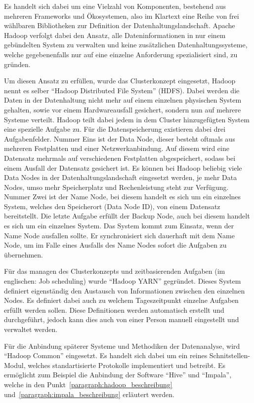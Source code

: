 Es handelt sich dabei um eine Vielzahl von Komponenten, bestehend aus mehreren
Frameworks und Ökosystemen, also im Klartext eine Reihe von frei wählbaren
Bibliotheken zur Definition der Datenhaltungslandschaft. Apache Hadoop verfolgt
dabei den Ansatz, alle Dateninformationen in nur einem gebündelten System zu
verwalten und keine zusätzlichen Datenhaltungssysteme, welche gegebenenfalls
nur auf eine einzelne Anforderung spezialisiert sind, zu gründen.

Um diesen Ansatz zu erfüllen, wurde das Clusterkonzept eingesetzt, Hadoop nennt
es selber ``Hadoop Distributed File System'' (HDFS).  Dabei werden die Daten in
der Datenhaltung nicht mehr auf einem einzelnen physischen System gehalten,
sowie vor einem Hardwareausfall gesichert, sondern nun auf mehrere Systeme
verteilt. Hadoop teilt dabei jedem in dem Cluster hinzugefügten System eine
spezielle Aufgabe zu. Für die Datenspeicherung existieren dabei drei
Aufgabenfelder. Nummer Eins ist der Data Node, dieser besteht oftmals aus
mehreren Festplatten und einer Netzwerkanbindung. Auf diesem wird eine
Datensatz mehrmals auf verschiedenen Festplatten abgespeichert, sodass bei
einem Ausfall der Datensatz gesichert ist. Es können bei Hadoop beliebig viele
Data Nodes in der Datenhaltungslandschaft eingesetzt werden, je mehr Data
Nodes, umso mehr Speicherplatz und Rechenleistung steht zur Verfügung. Nummer
Zwei ist der Name Node, bei diesem handelt es sich um ein einzelnes System,
welches den Speicherort (Data Node ID), von einem Datensatz bereitstellt. Die
letzte Aufgabe erfüllt der Backup Node, auch bei diesem handelt es sich um ein
einzelnes System. Das System kommt zum Einsatz, wenn der Name Node ausfallen
sollte. Er synchronisiert sich dauerhaft mit dem Name Node, um im Falle eines
Ausfalls des Name Nodes sofort die Aufgaben zu übernehmen.

Für das managen des Clusterkonzepts und zeitbasierenden Aufgaben (im
englischen: Job scheduling) wurde ``Hadoop YARN'' gegründet. Dieses System
definiert eigenständig den Austausch von Informationen zwischen den einzelnen
Nodes. Es definiert dabei auch zu welchem Tageszeitpunkt einzelne Aufgaben
erfüllt werden sollen. Diese Definitionen werden automatisch erstellt und
durchgeführt, jedoch kann dies auch von einer Person manuell eingestellt und
verwaltet werden.

Für die Anbindung späterer Systeme und Methodiken der Datenanalyse, wird
``Hadoop Common'' eingesetzt. Es handelt sich dabei um ein reines
Schnitstellen-Modul, welches standartisierte Protokolle implementiert und
betreibt. Es ermöglicht zum Beispiel die Anbindung der Software ``Hive'' und
``Impala'', welche in den Punkt~\ref{paragraph:hadoop_beschreibung}
und~\ref{paragraph:impala_beschreibung} erläutert werden.

